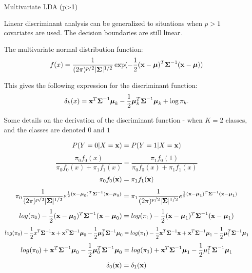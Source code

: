 \documentclass[10pt,ignorenonframetext,]{beamer}
\begin{document}
\begin{frame}

\begin{block}{Multivariate LDA (p\textgreater{}1)}

Linear discriminant analysis can be generalized to situations when
\(p>1\) covariates are used. The decision boundaries are still linear.

The multivariate normal distribution function:
\[f(x) = \frac{1}{(2 \pi)^{p/2}|\boldsymbol{\Sigma}|^{1/2}}\exp({-\frac{1}{2}({\bf x}-\boldsymbol\mu)^T \boldsymbol{\Sigma}^{-1}({\bf x}-\boldsymbol\mu)})\]

This gives the following expression for the discriminant function:
\[\delta_k(x) = {\bf x}^T \boldsymbol{\Sigma}^{-1}\boldsymbol\mu_k - \frac{1}{2}\boldsymbol\mu_k^T \boldsymbol{\Sigma}^{-1}\boldsymbol\mu_k + \log \pi_k.\]

\end{block}

\end{frame}

\begin{frame}

Some details on the derivation of the discriminant function - when
\(K=2\) classes, and the classes are denoted \(0\) and \(1\)

\[P(Y=0 | X={\bf x}) = P(Y=1 | X={\bf x})\]
\[\frac{\pi_0f_0(x)}{\pi_0f_0(x)+\pi_1f_1(x)} = \frac{\pi_1f_0(1)}{\pi_0f_0(x)+\pi_1f_1(x)} \]
\[\pi_0 f_0({\bf x}) = \pi_1 f_1({\bf x})\]
\[\pi_0\frac{1}{(2 \pi)^{p/2}|\boldsymbol{\Sigma}|^{1/2}}
e^{\frac{1}{2}({\bf x}-\boldsymbol{\mu}_0)^T \boldsymbol{\Sigma}^{-1}({\bf x}-\boldsymbol{\mu}_0)} =  \pi_1\frac{1}{(2 \pi)^{p/2}|\boldsymbol{\Sigma}|^{1/2}}e^{\frac{1}{2}({\bf x}-\boldsymbol{\mu}_1)^T \boldsymbol{\Sigma}^{-1}({\bf x}-\boldsymbol{\mu}_1)} \]
\[log(\pi_0) -\frac{1}{2}({\bf x}-\boldsymbol{\mu}_0)^T \boldsymbol{\Sigma}^{-1}({\bf x}-\boldsymbol{\mu}_0) = log(\pi_1) -\frac{1}{2}({\bf x}-\boldsymbol{\mu}_1)^T \boldsymbol{\Sigma}^{-1}({\bf x}-\boldsymbol{\mu}_1) \]
\[log(\pi_0)  -\frac{1}{2}x^T\boldsymbol{\Sigma}^{-1}{\bf x} + {\bf x}^T\boldsymbol{\Sigma}^{-1}\boldsymbol{\mu}_0 - \frac{1}{2}\boldsymbol{\mu}_0^T\boldsymbol{\Sigma}^{-1}\boldsymbol{\mu}_0 = log(\pi_1)  -\frac{1}{2}{\bf x}^T\boldsymbol{\Sigma}^{-1}{\bf x} + {\bf x}^T\boldsymbol{\Sigma}^{-1}\boldsymbol{\mu}_1 - \frac{1}{2}\boldsymbol{\mu}_1^T\boldsymbol{\Sigma}^{-1}\boldsymbol{\mu}_1 \]
\[log(\pi_0) + {\bf x}^T\boldsymbol{\Sigma}^{-1}\boldsymbol{\mu}_0 - \frac{1}{2}\boldsymbol{\mu}_0^T\boldsymbol{\Sigma}^{-1}\boldsymbol{\mu}_0 = log(\pi_1) + {\bf x}^T\boldsymbol{\Sigma}^{-1}\boldsymbol{\mu}_1 - \frac{1}{2}\mu_1^T\boldsymbol{\Sigma}^{-1}\boldsymbol{\mu}_1\]
\[\delta_0({\bf x}) = \delta_1({\bf x}) \]

\end{frame}
\end{document}
